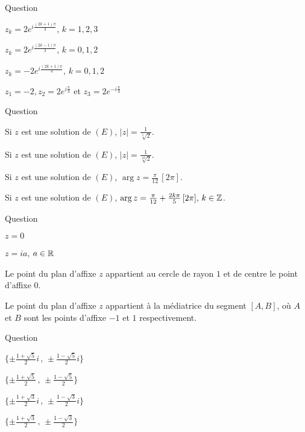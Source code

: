 \begin{multi}[multiple,feedback=
{On résout l'équation \(z^3=-8 = 2^3e^{i\pi}\), en utilisant l'écriture géométrique.
}]{Question}
    \item* \(z_k= 2e^{i\frac{(2k+1)\pi}{3}}\), \(k=1,2,3\)
    \item* \(z_k= 2e^{i\frac{(2k-1)\pi}{3}}\), \(k=0,1,2\)
    \item \(z_k= -2e^{i\frac{(2k+1)\pi}{3}}\), \(k=0,1,2\)
    \item* \(z_1= -2, z_2=2e^{i\frac{\pi}{3}}\) et \(z_3=2e^{-i\frac{\pi}{3}}\)
\end{multi}


\begin{multi}[multiple,feedback=
{Résoudre \( z^5= \frac{1+i}{\sqrt 3-i}= \frac{1}{\sqrt 2} e^{i\frac{5\pi}{12}}\), en utilisant l'écriture géométrique.
}]{Question}
    \item Si \(z\) est une solution de \((E)\), \(|z|=\frac{1}{\sqrt[5]{ 2}}\).
    \item* Si \(z\) est une solution de \((E)\), \(|z|=\frac{1}{\sqrt[10] 2}\).
    \item Si \(z\) est une solution de \((E)\), \(\arg z=\frac{\pi}{12} \, [2\pi]\).
    \item* Si \(z\) est une solution de \((E)\), \(\arg z=\frac{\pi}{12} + \frac{2k\pi}{5} \, [2\pi], \, k \in \mathbb{Z}\).
\end{multi}


\begin{multi}[multiple,feedback=
{Soit \(z\) tel que \(|z-1|=|z+1|\), \(M\) le point du plan d'affixe \(z\),  \(A\) et \(B\) les points d'affixe \(-1\) et \(1\)
respectivement. Alors, \(M\) est équidistant de \(A\) et \(B\).
}]{Question}
    \item \(z=0\)
    \item* \(z=ia\), \(a\in \mathbb{R}\)
    \item Le point du plan d'affixe \(z\) appartient au cercle de rayon \(1\) et de centre le point d'affixe \(0\).
    \item* Le point du plan d'affixe \(z\) appartient à la médiatrice du segment \([A,B]\), où \(A\) et \(B\) sont les points d'affixe \(-1\) et \(1\) respectivement.
\end{multi}


\begin{multi}[multiple,feedback=
{Remarquer que \((z^2+1)^2+z^2= (z^2+1)^2 - (iz)^2= (z^2-iz+1)(z^2+iz+1)\). On peut aussi poser \(Z=z^2\) et se ramener à une équation du second degré.
}]{Question}
    \item* \(\{ \pm \frac{1+\sqrt5}{2}i \, ,\,  \pm \frac{1-\sqrt5}{2}i\}\)
    \item \(\{\pm \frac{1+\sqrt5}{2} \, , \,  \pm \frac{1-\sqrt5}{2}\}\)
    \item \(\{\pm \frac{1+\sqrt3}{2}i \, , \,  \pm \frac{1-\sqrt3}{2}i\}\)
    \item \(\{\pm \frac{1+\sqrt3}{2} \, , \,  \pm \frac{1-\sqrt3}{2}\}\)
\end{multi}


